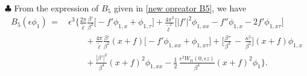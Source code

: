 \documentclass[10pt, reqno]{amsart}
\numberwithin{equation}{section}
\theoremstyle{definition}
\begin{document}
{{\smallskip\noindent $\clubsuit$
 From the expression of $B_5$ given in \eqref{new opreator B5}, we have
\begin{align} \label{expression of B5phi1}
B_5(\epsilon\phi_1) \, =\,&\epsilon^3
\Bigg\{\frac{2\pi}{{\tilde\ell}}\frac{\beta'} {\beta^2}\Big[- f' \phi_{1,x} +\phi_{1,\tau}\Big]
 +\frac{4\pi^2}{{\tilde\ell}^2}\Big[|f'|^2 \phi_{1,xx} -f''\phi_{1,x} -2f' \phi_{1,x\tau}\Big]
\nonumber\\[2mm]
&\qquad
+ \frac{4\pi}{{\tilde\ell}} \frac{\beta'}{\beta^2} (x+f)\big[- f' \phi_{1,xx} +\phi_{1,x\tau}\big]
+\Big[\frac{\beta''}{\beta^3} \,-\,\frac{\kappa^2}{\beta^2} \Big]
(x+f) \phi_{1,x}
\nonumber\\[2mm]
&\qquad
+ \frac{|\beta'|^2}{\beta^4}(x+f)^2 \phi_{1,xx}
-\frac{1}{2}\, \frac{\epsilon^2W_{tt}(0, \epsilon z)}{\beta^4} (x+f)^2\phi_{1}
\Bigg\}.
\end{align}






}}
\end{document}
